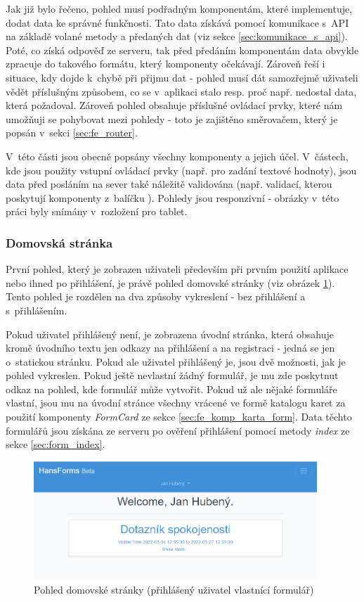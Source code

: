 	Jak již bylo řečeno, pohled musí podřadným komponentám, které implementuje, dodat data ke správné funkčnosti. Tato data získává pomocí komunikace s~API na základě volané metody a předaných dat (viz sekce \ref{sec:komunikace_s_api}). Poté, co získá odpověď ze serveru, tak před předáním komponentám data obvykle zpracuje do takového formátu, který komponenty očekávají. Zároveň řeší i situace, kdy dojde k~chybě při přijmu dat - pohled musí dát samozřejmě uživateli vědět příslušným způsobem, co se v~aplikaci stalo resp. proč např. nedostal data, která požadoval. Zároveň pohled obsahuje příslušné ovládací prvky, které nám umožňuji se pohybovat mezi pohledy - toto je zajištěno směrovačem, který je popsán v~sekci \ref{sec:fe_router}.
	
	V~této části jsou obecně popsány všechny komponenty a jejich účel. V~částech, kde jsou použity vstupní ovládací prvky (např. pro zadání textové hodnoty), jsou data před posláním na sever také náležitě validována (např. validací, kterou poskytují komponenty z~balíčku ). Pohledy jsou responzivní - obrázky v~této práci byly snímány v~rozložení pro tablet. 
		
		\subsubsection{Domovská stránka} %
		První pohled, který je zobrazen uživateli především při prvním použití aplikace nebo ihned po přihlášení, je právě pohled domovské stránky (viz obrázek \ref{fig:pohled_home}). Tento pohled je rozdělen na dva způsoby vykreslení - bez přihlášení a s~přihlášením.
		
		Pokud uživatel přihlášený není, je zobrazena úvodní stránka, která obsahuje kromě úvodního textu jen odkazy na přihlášení a na registraci - jedná se jen o~statickou stránku. Pokud ale uživatel přihlášený je, jsou dvě možnosti, jak je pohled vykreslen. Pokud ještě nevlastní žádný formulář, je mu zde poskytnut odkaz na pohled, kde formulář může vytvořit. Pokud už ale nějaké formuláře vlastní, jsou mu na úvodní stránce všechny vrácené ve formě katalogu karet za použití komponenty \textit{FormCard} ze sekce \ref{sec:fe_komp_karta_form}. Data těchto formulářů jsou získána ze serveru po ověření přihlášení pomocí metody \textit{index} ze sekce \ref{sec:form_index}.
		
		\begin{figure}[h]
			\centering
			\includegraphics[width=0.95\textwidth]{img/pohledy/home.png}
			\caption{Pohled domovské stránky (přihlášený uživatel vlastnící formulář)}
			\label{fig:pohled_home}
		\end{figure}
	
